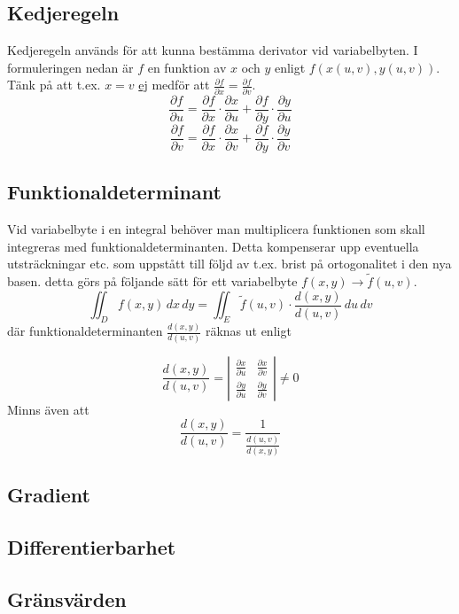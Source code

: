\documentclass[10pt,a4paper]{article}
\begin{document}
\subsection{Kedjeregeln}
Kedjeregeln används för att kunna bestämma derivator vid variabelbyten. I formuleringen nedan är $f$ en funktion av $x$ och $y$ enligt $f(x(u,v),y(u,v))$. Tänk på att t.ex. $x=v$ \underline{ej} medför att $\frac{\partial f}{\partial x} = \frac{\partial f}{\partial v}$.
\begin{equation}
\frac{\partial f}{\partial u}=\frac{\partial f}{\partial x}\cdot \frac{\partial x}{\partial u} + \frac{\partial f}{\partial y} \cdot \frac{\partial y}{\partial u}
\end{equation}
\begin{equation}
\frac{\partial f}{\partial v}=\frac{\partial f}{\partial x}\cdot \frac{\partial x}{\partial v} + \frac{\partial f}{\partial y} \cdot \frac{\partial y}{\partial v}
\end{equation}

\subsection{Funktionaldeterminant}
Vid variabelbyte i en integral behöver man multiplicera funktionen som skall integreras med funktionaldeterminanten. Detta kompenserar upp eventuella utsträckningar etc. som uppstått till följd av t.ex. brist på ortogonalitet i den nya basen. detta görs på följande sätt för ett variabelbyte $f(x,y) \rightarrow \tilde{f}(u,v)$.
\begin{equation}
\iint_D f(x,y)\,dx\,dy = \iint_E \tilde{f}(u,v)\cdot \frac{d(x,y)}{d(u,v)}\,du\,dv
\end{equation}
där funktionaldeterminanten $\frac{d(x,y)}{d(u,v)}$ räknas ut enligt

\begin{equation}
\frac{d(x,y)}{d(u,v)} = \left| \begin{array}{ccc}\frac{\partial x}{\partial u} & \frac{\partial x}{\partial v} \\ \frac{\partial y}{\partial u} & \frac{\partial y}{\partial v} \end{array} \right| \neq 0
\end{equation}
Minns även att 
\begin{equation}
\frac{d(x,y)}{d(u,v)} = \frac{1}{\frac{d(u,v)}{d(x,y)}}
\end{equation}


\subsection{Gradient}

\subsection{Differentierbarhet}

\subsection{Gränsvärden}
\end{document}
